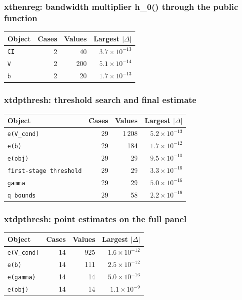 \documentclass[
  10.5pt,
  a4paper,
]{article}
\begin{document}
\subsubsection*{xthenreg: bandwidth multiplier h\_0() through the public function}

\begin{longtable}{@{}p{8.2cm}rrr@{}}
\toprule
Object & Cases & Values & Largest $|\Delta|$ \\
\midrule
\endhead
\texttt{CI} & 2 & 40 & $3.7\times10^{-13}$ \\
\texttt{V} & 2 & 200 & $5.1\times10^{-14}$ \\
\texttt{b} & 2 & 20 & $1.7\times10^{-13}$ \\
\bottomrule
\end{longtable}

\subsubsection*{xtdpthresh: threshold search and final estimate}

\begin{longtable}{@{}p{8.2cm}rrr@{}}
\toprule
Object & Cases & Values & Largest $|\Delta|$ \\
\midrule
\endhead
\texttt{e(V\_\allowbreak{}cond)} & 29 & 1\,208 & $5.2\times10^{-13}$ \\
\texttt{e(b)} & 29 & 184 & $1.7\times10^{-12}$ \\
\texttt{e(obj)} & 29 & 29 & $9.5\times10^{-10}$ \\
\texttt{first-stage threshold} & 29 & 29 & $3.3\times10^{-16}$ \\
\texttt{gamma} & 29 & 29 & $5.0\times10^{-16}$ \\
\texttt{q bounds} & 29 & 58 & $2.2\times10^{-16}$ \\
\bottomrule
\end{longtable}

\subsubsection*{xtdpthresh: point estimates on the full panel}

\begin{longtable}{@{}p{8.2cm}rrr@{}}
\toprule
Object & Cases & Values & Largest $|\Delta|$ \\
\midrule
\endhead
\texttt{e(V\_\allowbreak{}cond)} & 14 & 925 & $1.6\times10^{-12}$ \\
\texttt{e(b)} & 14 & 111 & $2.5\times10^{-12}$ \\
\texttt{e(gamma)} & 14 & 14 & $5.0\times10^{-16}$ \\
\texttt{e(obj)} & 14 & 14 & $1.1\times10^{-9}$ \\
\bottomrule
\end{longtable}
\end{document}
